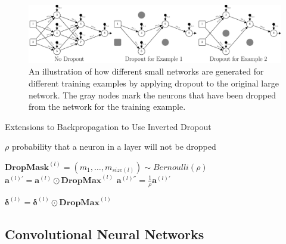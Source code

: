 \documentclass[xcolor={table}]{beamer}
\begin{document}
 \begin{frame} 
\begin{figure}[t]
\centerline{
\includegraphics[width=\linewidth]{./images/fmlpda_8_29.pdf}
}
\caption[An illustration of how different small networks are generated for different training examples by applying dropout to the original large network.]{An illustration of how different small networks are generated for different training examples by applying dropout to the original large network. The gray nodes mark the neurons that have been dropped from the network for the training example.}
\label{fig:dropout}
\end{figure}
\end{frame} 

\begin{frame}[plain]
\begin{algorithm}[H]
\tiny
\caption[Extensions to Backpropagation to Use Inverted Dropout]{Extensions to Backpropagation to Use Inverted Dropout}
\begin{algorithmic}[1]
\Require $\rho$ probability that a neuron in a layer will not be dropped

	\State $\mathbf{DropMask}^{(l)} = (m_1, \dots, m_{size(l)}) \sim Bernoulli(\rho)$ \label{line:vectorsample}
	\State $\mathbf{a}^{(l)'} = \mathbf{a}^{(l)} \odot \mathbf{DropMax}^{(l)}$ \label{line:masking}
	\State $\mathbf{a}^{(l)''} = \frac{1}{\rho} \mathbf{a}^{(l)'}$ \label{line:scaling}
\EndFor

	\State $\mathbf{\delta}^{(l)}=\mathbf{\delta}^{(l)} \odot \mathbf{DropMax}^{(l)}$ \label{line:setdeltatozero}
\EndFor
\end{algorithmic}
\label{alg:dropout}
\end{algorithm}
\end{frame}

\subsection{Convolutional Neural Networks}
\end{document}
